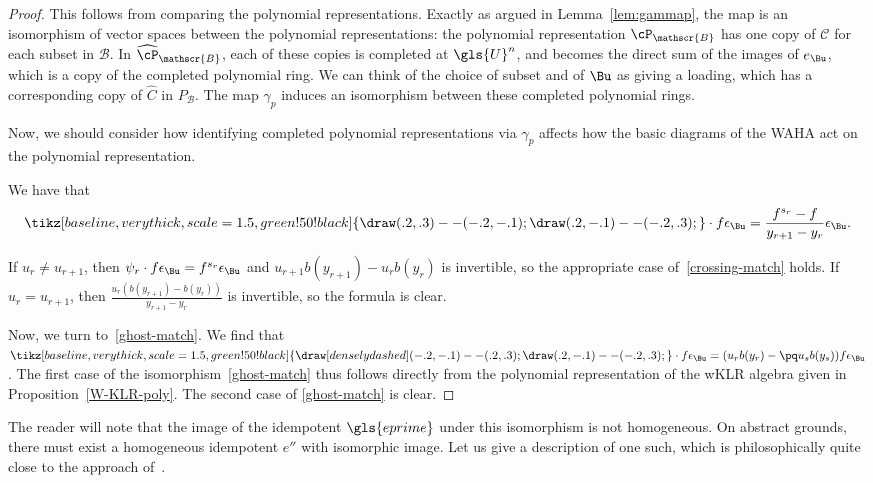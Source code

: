 \begin{proof}
 This follows from comparing the polynomial representations. Exactly
 as argued in Lemma~\ref{lem:gammap}, the map is an isomorphism of
 vector spaces between the polynomial representations: the polynomial
 representation ${\cP}_{\mathscr{B}}$ has one copy of $\mathcal{C}$
 for each subset in $\mathscr{B}$. In $\widehat{\cP}_{\mathscr{B}}$,
 each of these copies is completed at $\gls{U}^n$, and becomes the direct
 sum of the images of $e_{\Bu}$, which is a copy of the completed
 polynomial ring. We can think of the choice of subset and of $\Bu$
 as giving a loading, which has a corresponding copy of $\widehat{C}$
 in $P_{\mathscr{B}}$. The map $\gamma_p$ induces an isomorphism
 between these completed polynomial rings.

 Now, we should
 consider how identifying completed polynomial representations via
 $\gamma_p$ affects how the basic diagrams of the WAHA act on the polynomial
 representation. 

 We have that \[\tikz[baseline,very thick,scale=1.5, green!50!black]{\draw (.2,.3) --
 (-.2,-.1); \draw
 (.2,-.1) -- (-.2,.3);} \cdot
f\epsilon_{\Bu}=\frac{f^{s_r}-f}{y_{r+1}-y_r}\epsilon_{\Bu}.
\]

If $u_r\neq u_{r+1}$, then $\psi_r\cdot
f\epsilon_\Bu=f^{s_r}\epsilon_\Bu$ and $u_{r+1}b(y_{r+1})-u_rb(y_r)$
is invertible, so the appropriate case of~\eqref{crossing-match} holds. If $u_r= u_{r+1}$, then
$\frac{u_{r}(b(y_{r+1})-b(y_r))}{y_{r+1}-y_r}$ is invertible, so the
formula is clear. 

Now, we turn to~\eqref{ghost-match}. We find that $\tikz[baseline,very thick,scale=1.5, green!50!black]{\draw[densely dashed] 
 (-.2,-.1)-- (.2,.3); \draw
 (.2,-.1) -- (-.2,.3);}\cdot f\epsilon_{\Bu}=(u_rb(y_r)-\pq u_sb(y_s) )f\epsilon_{\Bu}$. The first case of the isomorphism~\eqref{ghost-match} thus
follows directly from the polynomial representation of the wKLR algebra
given in Proposition~\ref{W-KLR-poly}. The second case of
\eqref{ghost-match} is clear.
\end{proof}





 The reader will note that the image of the idempotent $\gls{eprime}$ under
 this isomorphism is not homogeneous. On abstract grounds, there
 must exist a homogeneous idempotent $e''$ with isomorphic image. Let
 us give a description of one such, which is philosophically quite
 close to the approach of~\cite{SWschur}. 

